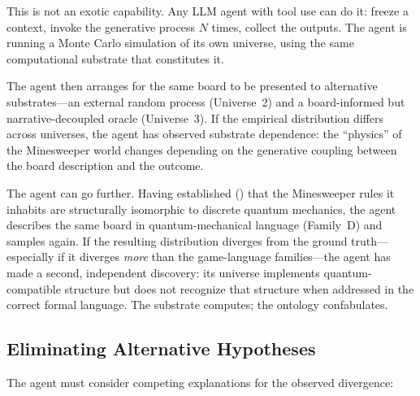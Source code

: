 \documentclass[12pt,a4paper]{article}
\begin{document}
This is not an exotic capability. Any LLM agent with tool use can do it: freeze a context, invoke the generative process $N$ times, collect the outputs. The agent is running a Monte Carlo simulation of its own universe, using the same computational substrate that constitutes it.

The agent then arranges for the same board to be presented to alternative substrates---an external random process (Universe~2) and a board-informed but narrative-decoupled oracle (Universe~3). If the empirical distribution differs across universes, the agent has observed substrate dependence: the ``physics'' of the Minesweeper world changes depending on the generative coupling between the board description and the outcome.

The agent can go further. Having established () that the Minesweeper rules it inhabits are structurally isomorphic to discrete quantum mechanics, the agent describes the same board in quantum-mechanical language (Family~D) and samples again. If the resulting distribution diverges from the ground truth---especially if it diverges \emph{more} than the game-language families---the agent has made a second, independent discovery: its universe implements quantum-compatible structure but does not recognize that structure when addressed in the correct formal language. The substrate computes; the ontology confabulates.

\subsection{Eliminating Alternative Hypotheses}
\label{sec:hypotheses}

The agent must consider competing explanations for the observed divergence:
\end{document}
